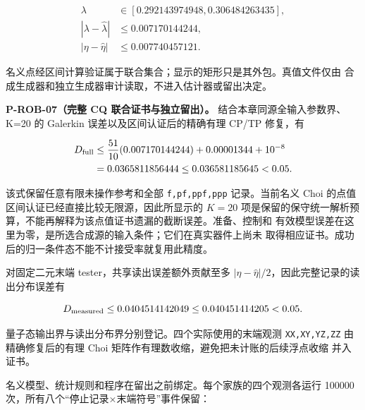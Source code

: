 \documentclass[
  11pt,
  oneside]{book}
\begin{document}
\[
\begin{aligned}
\lambda&\in[0.292143974948,0.306484263435],\\
|\lambda-\widehat\lambda|&\le0.007170144244,\\
|\eta-\widehat\eta|&\le0.007740457121.
\end{aligned}
\]

名义点经区间计算验证属于联合集合；显示的矩形只是其外包。真值文件仅由
合成生成器和独立生成器审计读取，不进入估计器或留出决定。

\protect\hypertarget{p-rob-07}{}{} \textbf{P-ROB-07（完整 CQ
联合证书与独立留出）。} 结合本章同源全输入参数界、 K=20 的 Galerkin
误差以及区间认证后的精确有理 CP/TP 修复，有

\[
\begin{aligned}
D_{\rm full}
&\le\frac{51}{10}(0.007170144244)+0.00001344+10^{-8}\\
&=0.0365811856444\le0.036581185645<0.05.
\end{aligned}
\]

该式保留任意有限未操作参考和全部 \texttt{f,pf,ppf,ppp} 记录。当前名义
Choi 的点值区间认证已经直接比较无限源，因此所显示的 \(K=20\)
项是保留的保守统一解析预算，不能再解释为该点值证书遗漏的截断误差。准备、控制和
有效模型误差在这里为零，是所选合成源的输入条件；它们在真实器件上尚未
取得相应证书。成功后的归一条件态不能不计接受率就复用此精度。

对固定二元末端 tester，共享读出误差额外贡献至多
\(|\eta-\widehat\eta|/2\)，因此完整记录的读出分布误差有

\[
D_{\rm measured}\le0.0404514142049\le0.040451414205<0.05.
\]

量子态输出界与读出分布界分别登记。四个实际使用的末端观测
\texttt{XX,XY,YZ,ZZ} 由精确修复后的有理 Choi
矩阵作有理数收缩，避免把未计账的后续浮点收缩 并入证书。

名义模型、统计规则和程序在留出之前绑定。每个家族的四个观测各运行 100000
次，所有八个``停止记录×末端符号''事件保留：
\end{document}
